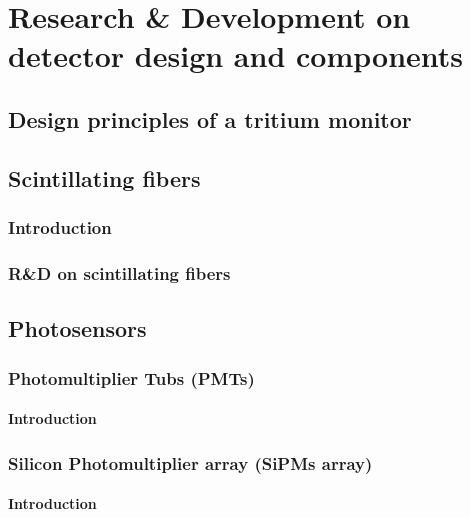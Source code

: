 \documentclass[12pt,a4paper]{book}
\begin{document}
\chapter{Research \& Development on detector design and components}\label{chap:ResearchandDevelopment}
	\section{Design principles of a tritium monitor}
	\newpage
	
	\section{Scintillating fibers} \label{sec:Scintillating}
		\subsection{Introduction}
		\newpage
		
		\subsection{R\&D on scintillating fibers}
		\newpage
		
	\section{Photosensors}\label{sec:Photosensors}		
		\subsection{Photomultiplier Tubs (PMTs)}\label{subsec:PMTs}
			\subsubsection{Introduction}
			\newpage
		
		\subsection{Silicon Photomultiplier array (SiPMs array)}\label{subsec:SiPMs}
			\subsubsection{Introduction}
			\newpage
		
\end{document}
